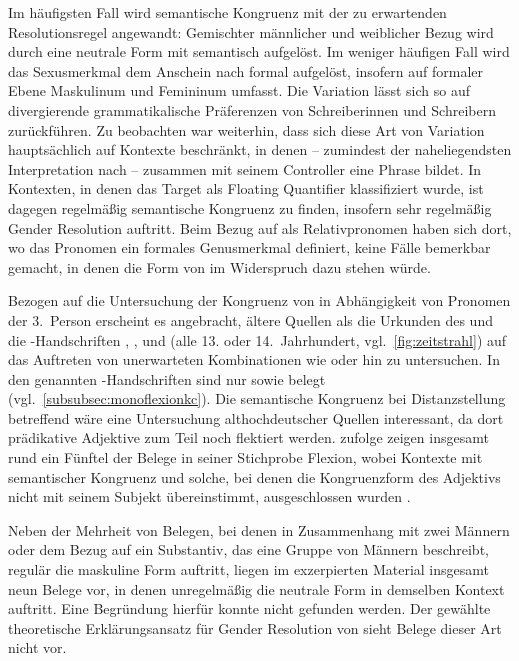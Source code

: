 Im häufigsten Fall wird semantische Kongruenz mit der zu erwartenden
Resolutionsregel angewandt: Gemischter männlicher und weiblicher Bezug wird
durch eine neutrale Form mit \mbox{} semantisch aufgelöst. Im weniger
häufigen Fall wird das Sexusmerkmal dem Anschein nach formal aufgelöst,
insofern  auf formaler Ebene Maskulinum und Femininum umfasst. Die
Variation lässt sich so auf divergierende grammatikalische Präferenzen von
Schreiberinnen und Schreibern zurück\-führen. Zu beobachten war weiterhin, dass
sich diese Art von Variation hauptsächlich auf Kontexte beschränkt, in denen
 -- zumindest der naheliegendsten Interpretation nach --
zusammen mit seinem Controller eine Phrase bildet. In Kontexten, in denen das
Target als Floating Quantifier klassifiziert wurde, ist dagegen regelmäßig
semantische Kongruenz zu finden, insofern sehr regelmäßig Gender Resolution
auftritt. Beim Bezug auf  als Relativpronomen haben sich dort, wo
das Pronomen ein formales Genusmerkmal definiert, keine Fälle bemerkbar
gemacht, in denen die Form von  im Widerspruch dazu stehen
würde.

Bezogen auf die Untersuchung der Kongruenz von  in Abhängigkeit
von Pro\-nomen der 3.~Person erscheint es angebracht, ältere Quellen als die
Urkunden des \CAO{} und die \KC{}-Handschriften
\citet{kc:B1}, \citet{kc:C1}, \citet{kc:K} und \citet{kc:VB} (alle 13. oder
14.~Jahrhundert, vgl.~\cref{fig:zeitstrahl}) auf das Auftreten von unerwarteten
Kombinationen wie  oder  hin zu untersuchen.
In den genannten \KC{}-Handschriften sind nur 
sowie  belegt (vgl.~\cref{subsubsec:monoflexionkc}). Die
semantische Kongruenz bei Distanz\-stellung betreffend wäre eine Untersuchung
althochdeutscher Quellen interessant, da dort prädikative Adjektive zum
Teil noch flektiert werden. \citet[310--311]{fleischer2007} zufolge zeigen
insgesamt rund ein Fünftel der Belege in seiner Stichprobe Flexion, wobei
Kontexte mit semantischer Kongruenz und solche, bei denen die Kongruenzform des
Adjektivs nicht mit seinem Subjekt übereinstimmt, ausgeschlossen wurden
\autocite[304]{fleischer2007}.

Neben der Mehrheit von Belegen, bei denen in Zusammenhang mit zwei Männern oder
dem Bezug auf ein Substantiv, das eine Gruppe von Männern beschreibt, regulär
die maskuline Form  auftritt, liegen im exzerpierten Material
insgesamt neun Belege vor, in denen unregelmäßig die neutrale Form
 in demselben Kontext auftritt. Eine Begründung hierfür konnte
nicht gefunden werden. Der gewählte theoretische Erklärungsansatz für Gender
Resolution von \citet{wechslerzlatic2003,wechsler2009} sieht Belege dieser Art
nicht vor.

